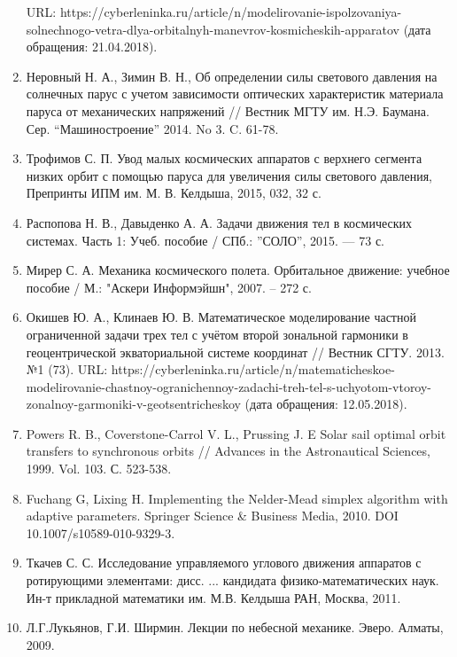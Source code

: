 \begin{enumerate}
URL: https://cyberleninka.ru/article/n/modelirovanie-ispolzovaniya-solnechnogo-vetra-dlya-orbitalnyh-manevrov-kosmicheskih-apparatov (дата обращения: 21.04.2018).
    \item Неровный Н. А., Зимин В. Н., Об определении силы светового давления на солнечных парус
с учетом зависимости оптических характеристик материала паруса от механических напряжений //
Вестник МГТУ им. Н.Э. Баумана. Сер. “Машиностроение” 2014. No 3. C. 61-78.
    \item Трофимов С. П. Увод малых космических аппаратов с верхнего сегмента низких орбит
с помощью паруса для увеличения силы светового давления, Препринты ИПМ им. М. В. Келдыша, 2015, 032, 32 с.
    \item Распопова Н. В., Давыденко А. А. Задачи движения тел в космических системах.
Часть 1: Учеб. пособие / СПб.: ”СОЛО”, 2015. — 73 с.
    \item Мирер С. А. Механика космического полета. Орбитальное движение: учебное пособие /
М.: "Аскери Информэйшн", 2007. -- 272 с.
    \item Окишев Ю. А., Клинаев Ю. В. Математическое моделирование частной ограниченной
задачи трех тел с учётом второй зональной гармоники в геоцентрической экваториальной
системе координат // Вестник СГТУ. 2013. №1 (73). URL:
https://cyberleninka.ru/article/n/matematicheskoe-modelirovanie-chastnoy-ogranichennoy-zadachi-treh-tel-s-uchyotom-vtoroy-zonalnoy-garmoniki-v-geotsentricheskoy
(дата обращения: 12.05.2018).
    \item Powers R. B., Coverstone-Carrol V. L., Prussing J. E Solar sail optimal
orbit transfers to synchronous orbits // Advances in the Astronautical Sciences, 1999. Vol. 103. С. 523-538.
    \item Fuchang G, Lixing H. Implementing the Nelder-Mead simplex algorithm
with adaptive parameters. Springer Science \& Business Media, 2010. DOI 10.1007/s10589-010-9329-3.
    \item Ткачев С. С. Исследование управляемого углового движения аппаратов с
ротирующими элементами: дисс. ... кандидата физико-математических наук. Ин-т прикладной математики им. М.В. Келдыша РАН,
Москва, 2011.
    \item Л.Г.Лукьянов, Г.И. Ширмин. Лекции по небесной механике. Эверо. Алматы, 2009.
\end{enumerate}
